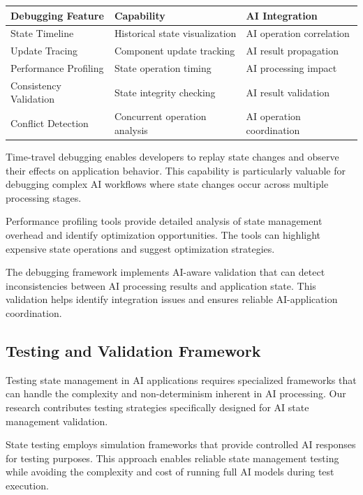 \begin{center}
\begin{tabular}{@{}lll@{}}
\toprule
\textbf{Debugging Feature} & \textbf{Capability} & \textbf{AI Integration} \\
\midrule
State Timeline & Historical state visualization & AI operation correlation \\
Update Tracing & Component update tracking & AI result propagation \\
Performance Profiling & State operation timing & AI processing impact \\
Consistency Validation & State integrity checking & AI result validation \\
Conflict Detection & Concurrent operation analysis & AI operation coordination \\
\bottomrule
\end{tabular}
\end{center}

Time-travel debugging enables developers to replay state changes and observe their effects on application behavior. This capability is particularly valuable for debugging complex AI workflows where state changes occur across multiple processing stages.

Performance profiling tools provide detailed analysis of state management overhead and identify optimization opportunities. The tools can highlight expensive state operations and suggest optimization strategies.

The debugging framework implements AI-aware validation that can detect inconsistencies between AI processing results and application state. This validation helps identify integration issues and ensures reliable AI-application coordination.

\subsection*{Testing and Validation Framework}

Testing state management in AI applications requires specialized frameworks that can handle the complexity and non-determinism inherent in AI processing. Our research contributes testing strategies specifically designed for AI state management validation.

State testing employs simulation frameworks that provide controlled AI responses for testing purposes. This approach enables reliable state management testing while avoiding the complexity and cost of running full AI models during test execution.

